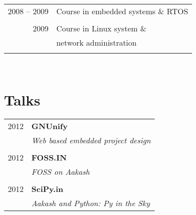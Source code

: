 \documentclass[10pt]{article} %
\begin{document}
{\begin{minipage}[t]{0.44\textwidth}
\begin{tabular}{rl}

2008 -- 2009 & \normalsize{Course in embedded systems \& RTOS} \\
&\\
	 

2009 & \normalsize{Course in Linux system \&} \\
     & \normalsize{network administration} \\	
&\\


\end{tabular}\\[10pt]






\section{Talks} 

\begin{tabular}{rl}
2012	 & \textbf{GNUnify}\\
& \textit{Web based embedded project design}\\ \\


2012	 & \textbf{FOSS.IN}\\
& \textit{FOSS on Aakash}\\ \\


2012	 & \textbf{SciPy.in}\\
& \textit{Aakash and Python: Py in the Sky}

\end{tabular}\\[10pt]



\end{minipage}}
\end{document}
